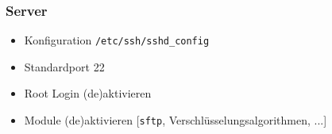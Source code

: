 \begin{frame}
\frametitle{Server}
\begin{itemize}
\item Konfiguration \texttt{/etc/ssh/sshd\_config}
\item Standardport 22
\item Root Login (de)aktivieren
\item Module (de)aktivieren [\texttt{sftp}, Verschlüsselungsalgorithmen, ...]
\end{itemize}
\end{frame}